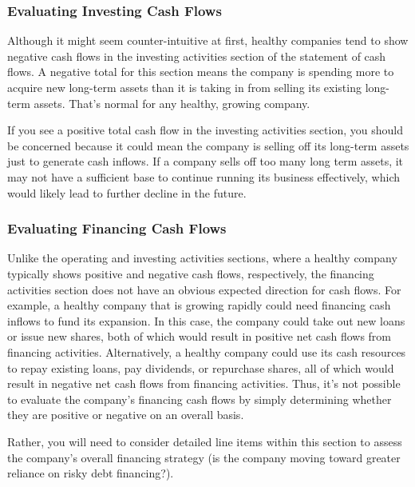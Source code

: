 \documentclass[../main.tex]{subfiles}
\begin{document}
	\subsubsection{Evaluating Investing Cash Flows}
	
	Although it might seem counter-intuitive at first, healthy companies tend 
	to show negative cash flows in the investing activities section of the 
	statement of cash flows. A negative total for this section means the 
	company is spending more to acquire new long-term assets than it is taking 
	in from selling its existing long-term assets. That’s normal for any 
	healthy, growing company. 
	
	If you see a positive total cash flow in the investing activities section, 
	you should be concerned because it could mean the company is selling off 
	its long-term assets just to generate cash inflows. If a company sells off 
	too many long term assets, it may not have a sufficient base to continue 
	running its business effectively, which would likely lead to further 
	decline in the future.
	
	\subsubsection{Evaluating Financing Cash Flows}
	
	Unlike the operating and investing activities sections, where a healthy 
	company typically shows positive and negative cash flows, respectively, the 
	financing activities section does not have an obvious expected direction 
	for cash flows. For example, a healthy company that is growing rapidly 
	could need financing cash inflows to fund its expansion. In this case, the 
	company could take out new loans or issue new shares, both of which would 
	result in positive net cash flows from financing activities. Alternatively, 
	a healthy company could use its cash resources to repay existing loans, pay 
	dividends, or repurchase shares, all of which would result in negative net 
	cash flows from financing activities. Thus, it’s not possible to evaluate 
	the company’s financing cash flows by simply determining whether they are 
	positive or negative on an overall basis. 
	
	Rather, you will need to consider detailed line items within this section 
	to assess the company’s overall financing strategy (is the company moving 
	toward greater reliance on risky debt financing?).
	
\end{document}
